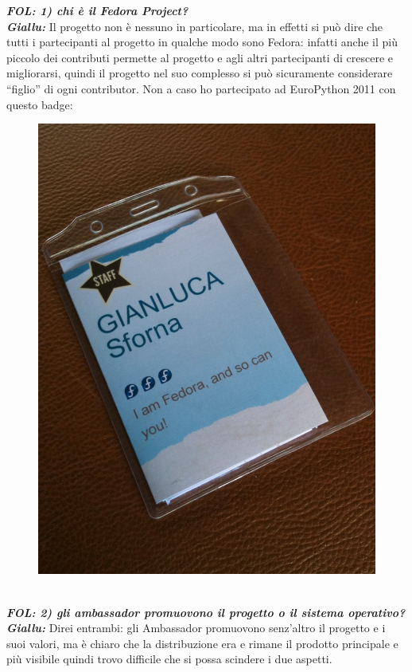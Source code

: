 \bigskip
\onehalfspacing
\emph{\textbf{FOL: 1) chi è il Fedora Project?}}\\
\emph{\textbf{Giallu: }}Il progetto non è nessuno in particolare, ma in effetti si può dire che tutti i partecipanti al progetto in qualche modo sono Fedora: infatti anche il più piccolo dei contributi permette al progetto e agli altri partecipanti di crescere e migliorarsi, quindi il progetto nel suo complesso si può sicuramente considerare ``figlio'' di ogni contributor. Non a caso ho partecipato ad EuroPython 2011 con questo badge:
\begin{figure}[htbp]
\centering
\includegraphics[scale=.10]{articoli/varie/immagini/badge.jpg}\\
\end{figure} \\

\emph{\textbf{FOL: 2) gli ambassador promuovono il progetto o il sistema operativo?}}\\
\emph{\textbf{Giallu: }}Direi entrambi: gli Ambassador promuovono senz'altro il progetto e i suoi valori, ma è chiaro che la distribuzione era e rimane il prodotto principale e più visibile quindi trovo difficile che si possa scindere i due aspetti.\\

